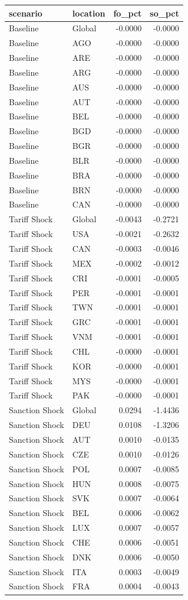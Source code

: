 \begin{tabular}{llrr}
\toprule
scenario & location & fo\_pct & so\_pct \\
\midrule
Baseline & Global & -0.0000 & -0.0000 \\
Baseline & AGO & -0.0000 & -0.0000 \\
Baseline & ARE & -0.0000 & -0.0000 \\
Baseline & ARG & -0.0000 & -0.0000 \\
Baseline & AUS & -0.0000 & -0.0000 \\
Baseline & AUT & -0.0000 & -0.0000 \\
Baseline & BEL & -0.0000 & -0.0000 \\
Baseline & BGD & -0.0000 & -0.0000 \\
Baseline & BGR & -0.0000 & -0.0000 \\
Baseline & BLR & -0.0000 & -0.0000 \\
Baseline & BRA & -0.0000 & -0.0000 \\
Baseline & BRN & -0.0000 & -0.0000 \\
Baseline & CAN & -0.0000 & -0.0000 \\
Tariff Shock & Global & -0.0043 & -0.2721 \\
Tariff Shock & USA & -0.0021 & -0.2632 \\
Tariff Shock & CAN & -0.0003 & -0.0046 \\
Tariff Shock & MEX & -0.0002 & -0.0012 \\
Tariff Shock & CRI & -0.0001 & -0.0005 \\
Tariff Shock & PER & -0.0001 & -0.0001 \\
Tariff Shock & TWN & -0.0001 & -0.0001 \\
Tariff Shock & GRC & -0.0001 & -0.0001 \\
Tariff Shock & VNM & -0.0001 & -0.0001 \\
Tariff Shock & CHL & -0.0000 & -0.0001 \\
Tariff Shock & KOR & -0.0000 & -0.0001 \\
Tariff Shock & MYS & -0.0000 & -0.0001 \\
Tariff Shock & PAK & -0.0000 & -0.0001 \\
Sanction Shock & Global & 0.0294 & -1.4436 \\
Sanction Shock & DEU & 0.0108 & -1.3206 \\
Sanction Shock & AUT & 0.0010 & -0.0135 \\
Sanction Shock & CZE & 0.0010 & -0.0126 \\
Sanction Shock & POL & 0.0007 & -0.0085 \\
Sanction Shock & HUN & 0.0008 & -0.0075 \\
Sanction Shock & SVK & 0.0007 & -0.0064 \\
Sanction Shock & BEL & 0.0006 & -0.0062 \\
Sanction Shock & LUX & 0.0007 & -0.0057 \\
Sanction Shock & CHE & 0.0006 & -0.0051 \\
Sanction Shock & DNK & 0.0006 & -0.0050 \\
Sanction Shock & ITA & 0.0003 & -0.0049 \\
Sanction Shock & FRA & 0.0004 & -0.0043 \\
\bottomrule
\end{tabular}
